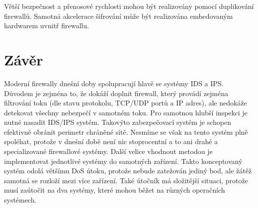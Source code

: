 \documentclass[11pt,twoside,a4paper]{article}
\begin{document}
Větší bezpečnost a přenosové rychlosti mohou být realizovány pomocí duplikování firewallů. Samotná akcelerace šifrování může být realizována embedovaným hardwarem uvnitř firewallu.

\section{Závěr}
Moderní firewally dnešní doby spolupracují hlavě se systémy IDS a IPS. Důvodem je zejména to, že dokáží doplnit firewall, který provádí zejména filtrování toku (dle stavu protokolu, TCP/UDP portů a IP adres), ale nedokáže detekovat všechny nebezpečí v samotném toku. Pro samotnou hlubší inspekci je nutné nasadit IDS/IPS systém. Takovýto zabezpečovací systém je schopen efektivně obránit perimetr chráněné sítě. Nesmíme se však na tento systém plně spoléhat, protože v dnešní době není nic stoprocentní a to ani drahé a specializované firewallové systémy. Další velice vhodnout metodou je implementovat jednotlivé systémy do samotných zařízení. Takto konceptovaný systém odolá většímu DoS útoku, protože nebude zatežován jediný bod, ale žátěž samotná se rozloží mezi více zařízení. Také útočník má složitější situaci, protože musí zaútočit na dva systémy, které mohou běžet na různých operačních systémech.
\nocite{*}
{
	\def\CS{$\cal C\kern-0.1667em\lower.5ex\hbox{$\cal S$}\kern-0.075em $}
	
}
\end{document}
